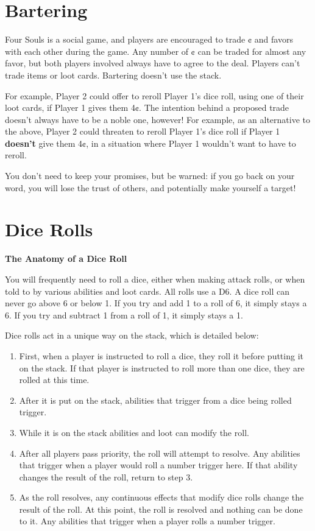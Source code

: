 \documentclass[a4paper, twoside]{report} %
\begin{document}
    \chapter{Bartering}
    \label{bartering}
    Four Souls is a social game, and players are encouraged to trade ¢ and favors with each other during the game. Any number of ¢ can be traded for almost any favor, but both players involved always have to agree to the deal. Players can’t trade items or loot cards. Bartering doesn’t use the stack.

    For example, Player 2 could offer to reroll Player 1’s dice roll, using one of their loot cards, if Player 1 gives them 4¢. The intention behind a proposed trade doesn’t always have to be a noble one, however! For example, as an alternative to the above, Player 2 could threaten to reroll Player 1’s dice roll if Player 1 \textbf{doesn’t} give them 4¢, in a situation where Player 1 wouldn’t want to have to reroll.

    You don’t need to keep your promises, but be warned: if you go back on your word, you will lose the trust of others, and potentially make yourself a target!

    \chapter{Dice Rolls}
    \label{dicerolls}
    \textbf{The Anatomy of a Dice Roll}

    You will frequently need to roll a dice, either when making attack rolls, or when told to by various abilities and loot cards. All rolls use a D6. A dice roll can never go above 6 or below 1. If you try and add 1 to a roll of 6, it simply stays a 6. If you try and subtract 1 from a roll of 1, it simply stays a 1.

    Dice rolls act in a unique way on the stack, which is detailed below:
    \begin{enumerate}
        \item First, when a player is instructed to roll a dice, they roll it before putting it on the stack. If that player is instructed to roll more than one dice, they are rolled at this time.
        \item After it is put on the stack, abilities that trigger from a dice being rolled trigger.
        \item While it is on the stack abilities and loot can modify the roll.
        \item After all players pass priority, the roll will attempt to resolve. Any abilities that trigger when a player would roll a number trigger here. If that ability changes the result of the roll, return to step 3.
        \item As the roll resolves, any continuous effects that modify dice rolls change the result of the roll. At this point, the roll is resolved and nothing can be done to it. Any abilities that trigger when a player rolls a number trigger.
    \end{enumerate}
\end{document}
